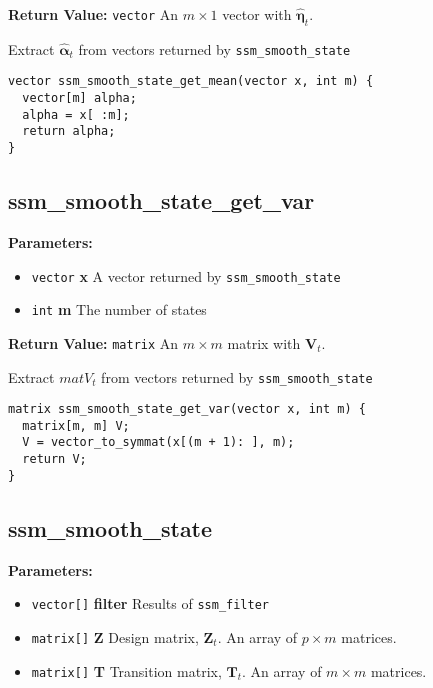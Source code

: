 \documentclass[]{book}
\providecommand{\tightlist}{%
  \setlength{\itemsep}{0pt}\setlength{\parskip}{0pt}}
\newcommand{\mat}[1]{\boldsymbol{#1}}
\renewcommand{\vec}[1]{\boldsymbol{#1}}
\begin{document}
\textbf{Return Value:} \texttt{vector} An \(m \times 1\) vector with
\(\hat{\vec{\eta}}_t\).

Extract \(\hat{\vec{\alpha}}_t\) from vectors returned by
\texttt{ssm\_smooth\_state}

\begin{verbatim}
vector ssm_smooth_state_get_mean(vector x, int m) {
  vector[m] alpha;
  alpha = x[ :m];
  return alpha;
}
\end{verbatim}

\subsection{ssm\_smooth\_state\_get\_var}\label{ssmux5fsmoothux5fstateux5fgetux5fvar}

\textbf{Parameters:}

\begin{itemize}
\tightlist
\item
  \texttt{vector} \textbf{x} A vector returned by
  \texttt{ssm\_smooth\_state}
\item
  \texttt{int} \textbf{m} The number of states
\end{itemize}

\textbf{Return Value:} \texttt{matrix} An \(m \times m\) matrix with
\(\mat{V}_t\).

Extract \(mat{V}_t\) from vectors returned by
\texttt{ssm\_smooth\_state}

\begin{verbatim}
matrix ssm_smooth_state_get_var(vector x, int m) {
  matrix[m, m] V;
  V = vector_to_symmat(x[(m + 1): ], m);
  return V;
}

\end{verbatim}

\subsection{ssm\_smooth\_state}\label{ssmux5fsmoothux5fstate}

\textbf{Parameters:}

\begin{itemize}
\tightlist
\item
  \texttt{vector{[}{]}} \textbf{filter} Results of \texttt{ssm\_filter}
\item
  \texttt{matrix{[}{]}} \textbf{Z} Design matrix, \(\mat{Z}_t\). An
  array of \(p \times m\) matrices.
\item
  \texttt{matrix{[}{]}} \textbf{T} Transition matrix, \(\mat{T}_t\). An
  array of \(m \times m\) matrices.
\end{itemize}
\end{document}
